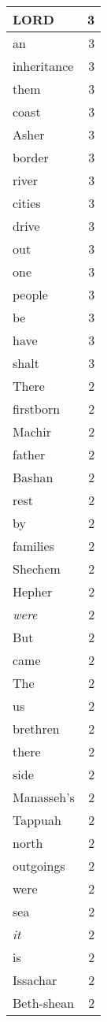 \begin{center}
\begin{longtable}{l|r}
LORD & 3 \\ \hline
an & 3 \\ \hline
inheritance & 3 \\ \hline
them & 3 \\ \hline
coast & 3 \\ \hline
Asher & 3 \\ \hline
border & 3 \\ \hline
river & 3 \\ \hline
cities & 3 \\ \hline
drive & 3 \\ \hline
out & 3 \\ \hline
one & 3 \\ \hline
people & 3 \\ \hline
be & 3 \\ \hline
have & 3 \\ \hline
shalt & 3 \\ \hline
There & 2 \\ \hline
firstborn & 2 \\ \hline
Machir & 2 \\ \hline
father & 2 \\ \hline
Bashan & 2 \\ \hline
rest & 2 \\ \hline
by & 2 \\ \hline
families & 2 \\ \hline
Shechem & 2 \\ \hline
Hepher & 2 \\ \hline
\emph{were} & 2 \\ \hline
But & 2 \\ \hline
came & 2 \\ \hline
The & 2 \\ \hline
us & 2 \\ \hline
brethren & 2 \\ \hline
there & 2 \\ \hline
side & 2 \\ \hline
Manasseh's & 2 \\ \hline
Tappuah & 2 \\ \hline
north & 2 \\ \hline
outgoings & 2 \\ \hline
were & 2 \\ \hline
sea & 2 \\ \hline
\emph{it} & 2 \\ \hline
is & 2 \\ \hline
Issachar & 2 \\ \hline
Beth-shean & 2 \\ \hline

\end{longtable}
\end{center}
